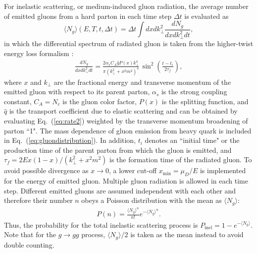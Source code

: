 \documentclass[aps,prc,twocolumn,floatfix,superscriptaddress,nofootinbib]{revtex4}
\begin{document}
For inelastic scattering, or medium-induced gluon radiation, the average number of emitted gluons from a hard parton in each time step $\Delta t$ is evaluated as \cite{Cao:2013ita,Cao:2015hia,Cao:2016gvr}
\begin{equation}
 \label{eq:gluonnumber}
 \langle N_g \rangle(E,T,t,\Delta t) = \Delta t \int dxdk_\perp^2 \frac{dN_g}{dx dk_\perp^2 dt},
\end{equation}
in which the differential spectrum of radiated gluon is taken from the higher-twist energy loss formalism \cite{Guo:2000nz,Majumder:2009ge,Zhang:2003wk}:
\begin{eqnarray}
\label{eq:gluondistribution}
\frac{dN_g}{dx dk_\perp^2 dt}=\frac{2\alpha_s C_A \hat{q} P(x)k_\perp^4}{\pi \left({k_\perp^2+x^2 m^2}\right)^4} \, {\sin}^2\left(\frac{t-t_i}{2\tau_f}\right),
\end{eqnarray}
where $x$ and $k_\perp$ are the fractional energy and transverse momentum of the emitted gluon with respect to its parent parton, $\alpha_s$ is the strong coupling constant, $C_A=N_c$ is the gluon color factor, $P(x)$ is the splitting function, and $\hat{q}$ is the transport coefficient due to elastic scattering and can be obtained by evaluating Eq.~(\ref{eq:rate2}) weighted by the transverse momentum broadening of parton ``1". The mass dependence of gluon emission from heavy quark is included in Eq.~(\ref{eq:gluondistribution}). In addition, $t_i$ denotes an ``initial time" or the production time of the parent parton from which the gluon is emitted, and $\tau_f={2Ex(1-x)}/{(k_\perp^2+x^2m^2)}$ is the formation time of the radiated gluon. To avoid possible divergence as $x\rightarrow 0$, a lower cut-off $x_\mathrm{min}=\mu_D/E$ is implemented for the energy of emitted gluon. Multiple gluon radiation is allowed in each time step. Different emitted gluons are assumed independent with each other and therefore their number $n$ obeys a Poisson distribution with the mean as $\langle N_g \rangle$:  
\begin{eqnarray}
\label{eq:possion}
P(n)=\frac{\langle N_g\rangle^n}{n!}e^{-\langle N_g\rangle^n}.
\end{eqnarray}
Thus, the probability for the total inelastic scattering process is $P_\mathrm{inel}=1-e^{-\langle N_g \rangle}$. Note that for the $g\rightarrow gg$ process, $\langle N_g\rangle/2$ is taken as the mean instead to avoid double counting.
\end{document}
